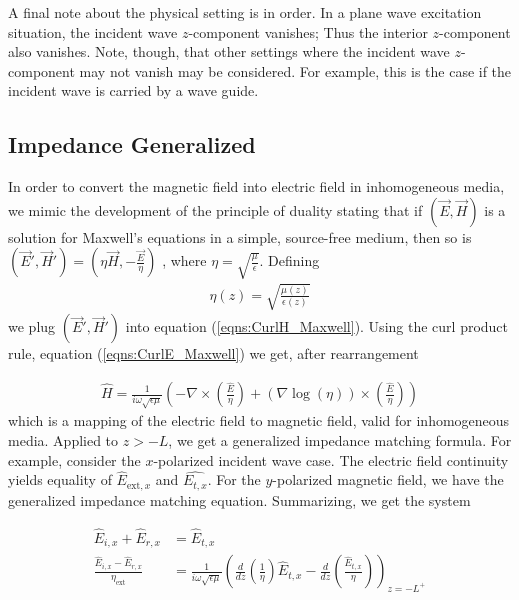 \documentclass[twocolumn,secnumarabic,amssymb, nobibnotes, aps, prd]{revtex4-1}
\begin{document}
A final note about the physical setting is in order. In a plane wave excitation situation, the incident wave $z$-component vanishes; Thus the interior $z$-component also vanishes. Note, though, that other settings where the incident wave $z$-component may not vanish may be considered. For example, this is the case if the incident wave is carried by a wave guide.\\    

\subsection{Impedance Generalized}
\label{sec:Impedance}
In order to convert the magnetic field into electric  field in inhomogeneous media, we mimic the development of the principle of duality \cite{cheng2006fieldAndWave} stating that if $(\overrightarrow{E}, \overrightarrow{H})$ is a solution for Maxwell's equations in a simple, source-free medium, then so is $(\overrightarrow{E}', \overrightarrow{H}') = \left(\eta \overrightarrow{H}, -\frac{\overrightarrow{E} }{\eta} \right)$ , where $\eta = \sqrt{\frac{\mu}{\epsilon}}$. Defining 
\begin{align}
\eta(z) = \sqrt{\frac{ \mu(z) }{ \epsilon(z) }}
\label{eqns:Inpedance1}
\end{align}
we plug $(\overrightarrow{E}', \overrightarrow{H}')$ into equation (\ref{eqns:CurlH_Maxwell}). Using the curl product rule, equation (\ref{eqns:CurlE_Maxwell}) we get, after rearrangement 

\begin{align}
\hat{H} = \frac{1}{i \omega  \sqrt{ \epsilon \mu}} \left( -\nabla \times \left( \frac{\hat{E}}{\eta} \right) + (\nabla \log(\eta)) 
\times  \left( \frac{\hat{E}}{\eta} \right) \right)
\end{align}
which is a mapping of the electric field to magnetic field, valid for inhomogeneous media. Applied to $z>-L$, we get a generalized impedance matching formula. For example, consider the $x$-polarized incident wave case. The electric field continuity yields equality of $\hat{E}_{\text{ext},x}$ and $\hat{E_{t,x}}$. 
For the $y$-polarized magnetic field, we have the generalized impedance matching equation. Summarizing, we get the system

\begin{align}
\label{eqns:GenImpedanceMatch}
\hat{E}_{i,x} + \hat{E}_{r,x} &= \hat{E}_{t,x} \\
\frac{\hat{E}_{i,x}-\hat{E}_{r,x}}{\eta_{\text{ext}}} &= \frac{1}{i \omega \sqrt{\epsilon \mu}}\left(\frac{d}{dz}\left(\frac{1}{\eta} \right)\hat{E}_{t,x}-\frac{d}{dz}\left(\frac{\hat{E}_{t,x}}{\eta} \right)  \right)_{z=-L^+}
\end{align}
  
\end{document}
